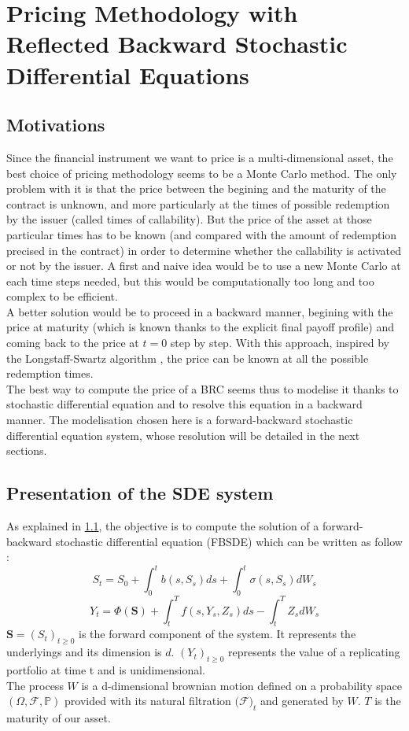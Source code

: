 \documentclass[a4paper,11pt,english]{book}
\begin{document}
\pagestyle{fancy}

\chapter{Pricing Methodology with Reflected Backward Stochastic Differential Equations}

\section{Motivations}
\label{sec:motivations}
Since the financial instrument we want to price is a multi-dimensional asset, the best choice of pricing methodology seems to be a Monte Carlo method. The only problem with it is that the price between the begining and the maturity of the contract is unknown, and more particularly at the times of possible redemption by the issuer (called times of callability). But the price of the asset at those particular times has to be known (and compared with the amount of redemption precised in the contract) in order to determine whether the callability is activated or not by the issuer. A first and naive idea would be to use a new Monte Carlo at each time steps needed, but this would be computationally too long and too complex to be efficient.  \\

A better solution would be to proceed in a backward manner, begining with the price at maturity (which is known thanks to the explicit final payoff profile) and coming back to the price at $t=0$ step by step. With this approach, inspired by the Longstaff-Swartz algorithm \cite{schwartz2001valuing}, the price can be known at all the possible redemption times.\\

The best way to compute the price of a BRC seems thus to modelise it thanks to stochastic differential equation and to resolve this equation in a backward manner. The modelisation chosen here is a forward-backward stochastic differential equation system, whose resolution will be detailed in the next sections.

\section{Presentation of the SDE system}
\label{sec:SDE-presentation}
As explained in \ref{sec:motivations}, the objective is to compute the solution of  a forward-backward stochastic differential equation (FBSDE) which can be written as follow :
$$S_{t} = S_{0}+\int_{0}^{t}b(s,S_{s})ds +\int_{0}^{t} \sigma(s,S_{s})dW_{s}$$
$$Y_{t} = \Phi(\textbf{S}) + \int_{t}^{T}f(s,Y_{s},Z_{s})ds -\int_{t}^{T}Z_{s}dW_{s}$$
$\textbf{S}=(S_{t})_{t\geq0}$ is the forward component of the system. It represents the underlyings and its dimension is $d$. $(Y_{t})_{t\geq0}$ represents the value of a replicating portfolio at time t and is unidimensional.\\
The process $W$ is a d-dimensional brownian motion defined on a probability space $(\Omega,\mathcal{F},\mathbb{P})$ provided with its natural filtration $(\mathcal{F)}_{t}$ and generated by $W$. 
$T$ is the maturity of our asset.\\
\end{document}
